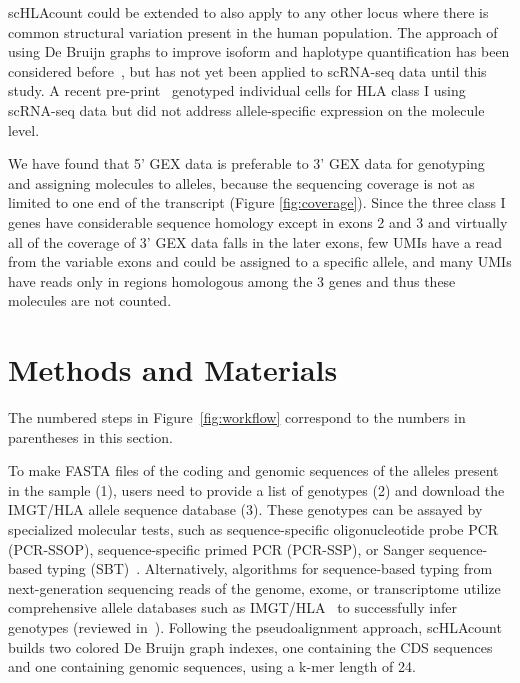 \documentclass{article}[12pt]
\begin{document}
scHLAcount could be extended to also apply to any other locus where there is common structural variation present in the human population. The approach of using De Bruijn graphs to improve isoform and haplotype quantification has been considered before~\parencite{Patro2017,Bray2016}, but has not yet been applied to scRNA-seq data until this study. A recent pre-print~\parencite{Tian2019} genotyped individual cells for HLA class I using scRNA-seq data but did not address allele-specific expression on the molecule level.

We have found that 5' GEX data is preferable to 3' GEX data for genotyping and assigning molecules to alleles, because the sequencing coverage is not as limited to one end of the transcript (Figure \ref{fig:coverage}). Since the three class I genes have considerable sequence homology except in exons 2 and 3 and virtually all of the coverage of 3' GEX data falls in the later exons, few UMIs have a read from the variable exons and could be assigned to a specific allele, and many UMIs have reads only in regions homologous among the 3 genes and thus these molecules are not counted. 


\section*{Methods and Materials}

The numbered steps in Figure~\ref{fig:workflow} correspond to the numbers in parentheses in this section.

To make FASTA files of the coding and genomic sequences of the alleles present in the sample (1), users need to provide a list of genotypes (2) and download the IMGT/HLA allele sequence database (3). These genotypes can be assayed by specialized molecular tests, such as sequence-specific oligonucleotide probe PCR (PCR-SSOP), sequence-specific primed PCR (PCR-SSP), or Sanger sequence-based typing (SBT)~\parencite{Erlich2012}. Alternatively, algorithms for sequence-based typing from next-generation sequencing reads of the genome, exome, or transcriptome utilize comprehensive allele databases such as IMGT/HLA~\parencite{Robinson2015} to successfully infer genotypes (reviewed in~\cite{Bauer2018}). Following the pseudoalignment approach\cite{Bray2016}, scHLAcount builds two colored De Bruijn graph indexes, one containing the CDS sequences and one containing genomic sequences, using a k-mer length of 24. 
\end{document}
